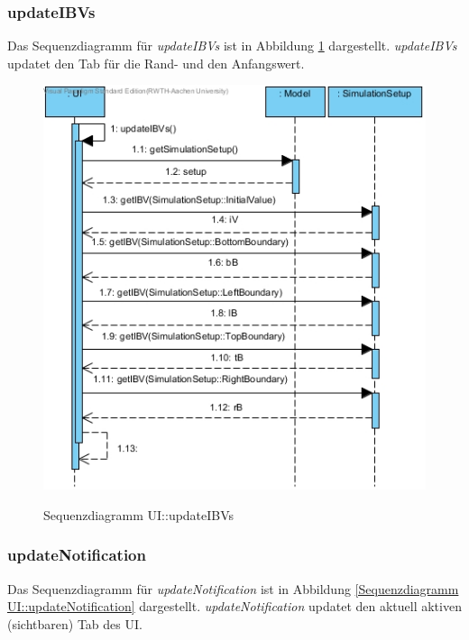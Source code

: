 \subsubsection*{updateIBVs}

Das Sequenzdiagramm für \emph{updateIBVs} ist in Abbildung \ref{Sequenzdiagramm UI::updateIBVs} dargestellt. \emph{updateIBVs} updatet den Tab für die Rand- und den Anfangswert.

\begin{figure}[H]
	\centering
	\includegraphics[scale=.6]{Bilder/UI__updateIBVs().jpg}\\
	\caption{Sequenzdiagramm UI::updateIBVs}
	\label{Sequenzdiagramm UI::updateIBVs}
\end{figure}

\subsubsection*{updateNotification}

Das Sequenzdiagramm für \emph{updateNotification} ist in Abbildung \ref{Sequenzdiagramm UI::updateNotification} dargestellt. \emph{updateNotification} updatet den aktuell aktiven (sichtbaren) Tab des UI.

